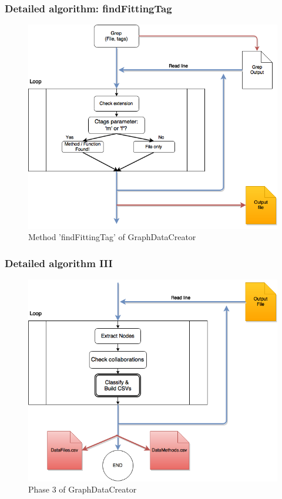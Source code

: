 \documentclass{beamer}
\begin{document}

\begin{frame}
\frametitle{Detailed algorithm: findFittingTag}
\begin{figure}
\includegraphics[scale=0.3]{GDCfft.png} 
\caption{Method 'findFittingTag' of GraphDataCreator}
\label{fig:phasefft}
\end{figure}
\end{frame}


\begin{frame}
\frametitle{Detailed algorithm III}
\begin{figure}
\includegraphics[scale=0.35]{GDCphase3.png} 
\caption{Phase 3 of GraphDataCreator}
\label{fig:phase3}
\end{figure}
\end{frame}
\end{document}
